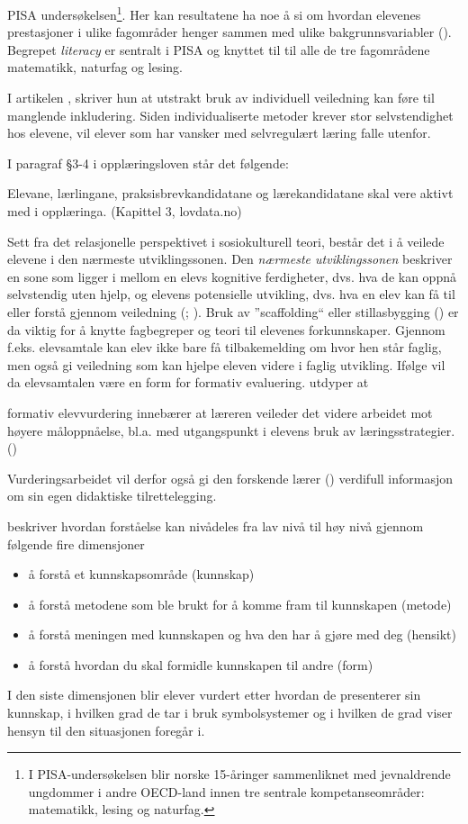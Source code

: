 \documentclass[main.tex]{subfiles}
\begin{document}
PISA undersøkelsen\footnote{I  PISA-undersøkelsen blir norske 15-åringer sammenliknet med jevnaldrende ungdommer i 
andre OECD-land innen tre sentrale kompetanseområder: matematikk, lesing og naturfag.}. 
Her kan resultatene ha noe å si om hvordan elevenes prestasjoner i ulike fagområder henger sammen med ulike 
bakgrunnsvariabler (). Begrepet \emph{literacy} er sentralt i PISA og knyttet til til alle de tre
fagområdene matematikk, naturfag og lesing.


I artikelen , skriver hun at utstrakt bruk av individuell veiledning kan føre
til manglende inkludering. Siden individualiserte metoder krever stor selvstendighet hos elevene, vil
elever som har vansker med selvregulært læring falle utenfor. 


I paragraf \S 3-4 i opplæringsloven står det \mbox{følgende:}
\begin{displayquote}
Elevane, lærlingane, praksisbrevkandidatane og lærekandidatane skal vere aktivt med i opplæringa.
(Kapittel 3, lovdata.no)
\end{displayquote}

Sett fra det relasjonelle perspektivet i sosiokulturell teori, består det i å veilede elevene i den 
nærmeste utviklingssonen. Den \emph{nærmeste utviklingssonen} beskriver en sone som ligger i mellom en elevs kognitive 
ferdigheter, dvs. hva de kan oppnå selvstendig uten hjelp, og elevens potensielle utvikling, dvs. 
hva en elev kan få til eller forstå gjennom veiledning (; ). 
Bruk av ''scaffolding`` eller stillasbygging () er da viktig for å knytte fagbegreper og 
teori til elevenes forkunnskaper. Gjennom f.eks. elevsamtale kan elev ikke bare få 
tilbakemelding om hvor hen står faglig, men også gi veiledning som kan hjelpe eleven videre i faglig utvikling.
Ifølge  vil da elevsamtalen være en form for formativ evaluering.  utdyper at
\begin{displayquote}
\textelp{} formativ elevvurdering innebærer at læreren veileder det videre arbeidet mot høyere måloppnåelse,
bl.a. med utgangspunkt i elevens  bruk av læringsstrategier.
() 
\end{displayquote}
Vurderingsarbeidet vil derfor også gi den forskende lærer () verdifull informasjon om sin egen didaktiske tilrettelegging.


 beskriver hvordan forståelse kan nivådeles fra lav nivå 
til høy nivå gjennom følgende fire dimensjoner
\begin{itemize} 
\item å forstå et kunnskapsområde (kunnskap)
\item å forstå metodene som ble brukt for å komme fram til kunnskapen (metode)
\item å forstå meningen med kunnskapen og hva den har å gjøre med deg (hensikt)
\item å forstå hvordan du skal formidle kunnskapen til andre (form)
\end{itemize}
I den siste dimensjonen blir elever vurdert etter hvordan de presenterer sin kunnskap,
i hvilken grad de tar i bruk symbolsystemer og i hvilken de grad viser hensyn til 
den situasjonen foregår i.
\end{document}

